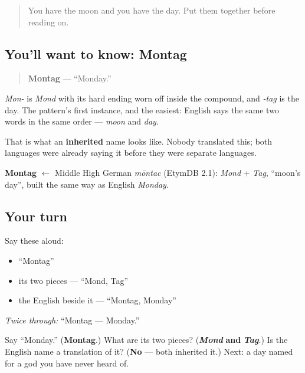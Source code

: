 \label{lesson:GE-C07-montag}



\begin{quote}
You have the moon and you have the day. Put them together before reading on.
\end{quote}

\subsection*{You'll want to know: Montag}
\begin{quote}
\textbf{Montag} — \textquotedblleft{}Monday.\textquotedblright{}
\end{quote}

\emph{Mon-} is \emph{Mond} with its hard ending worn off inside the compound, and \emph{-tag} is the day. The pattern's first instance, and the easiest: English says the same two words in the same order — \emph{moon} and \emph{day}.

That is what an \textbf{inherited} name looks like. Nobody translated this; both languages were already saying it before they were separate languages.

\begin{cousinweb}
\textbf{Montag} $\leftarrow$ Middle High German \emph{mōntac} (EtymDB 2.1): \emph{Mond} + \emph{Tag}, \textquotedblleft{}moon's day\textquotedblright{}, built the same way as English \emph{Monday}.
\end{cousinweb}

\subsection*{Your turn}
Say these aloud:

\begin{itemize}
\raggedright
  \item \textquotedblleft{}Montag\textquotedblright{}
  \item its two pieces — \textquotedblleft{}Mond, Tag\textquotedblright{}
  \item the English beside it — \textquotedblleft{}Montag, Monday\textquotedblright{}
\end{itemize}

\emph{Twice through:} \textquotedblleft{}Montag — Monday.\textquotedblright{}

\begin{tcolorbox}[breakable,colback=teal!4,colframe=teal!35!black,title={Before you move on}]
Say \textquotedblleft{}Monday.\textquotedblright{} (\textbf{Montag}.) What are its two pieces? (\emph{\textbf{Mond}} \textbf{and} \emph{\textbf{Tag}}.) Is the English name a translation of it? (\textbf{No} — both inherited it.) Next: a day named for a god you have never heard of.
\end{tcolorbox}
